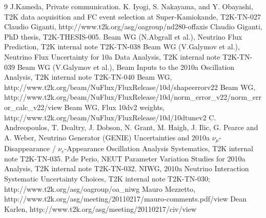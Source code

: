 \documentclass[final]{elsarticle}
\begin{document}
\begin{thebibliography}{9}
  J.Kameda, Private communication.
   K. Iyogi, S. Nakayama, and Y. Obayashi,
   T2K data acquisition and FC event selection at Super-Kamiokande,
   T2K-TN-027
%
%
  Claudio Giganti, http://www.t2k.org/asg/oagroup/nd280-offaxis
  Claudio Giganti, PhD thesis, T2K-THESIS-005.
%
%
  Beam WG (N.Abgrall et al.), Neutrino Flux Prediction, T2K internal note T2K-TN-038
  Beam WG (V.Galymov et al.), Neutrino Flux Uncertainty for 10a Data Analysis, T2K internal note T2K-TN-039
  Beam WG (V.Galymov et al.), Beam Inputs to the 2010a Oscillation Analysis, T2K internal note T2K-TN-040
  Beam WG, http://www.t2k.org/beam/NuFlux/FluxRelease/10d/shapeerrorv22
  Beam WG, http://www.t2k.org/beam/NuFlux/FluxRelease/10d/norm\_error\_v22/norm\_error\_calc\_v22/view
  Beam WG, Flux 10dv2 weights, http://www.t2k.org/beam/NuFlux/FluxRelease/10d/10dtunev2
%
%
  C. Andreopoulos, T. Dealtry, J. Dobson, N. Grant, M. Haigh, J. Ilic, G. Pearce and A. Weber,
  Neutrino Generator (GENIE) Uncertainties and 2010a 
  $\nu_{\mu}$-Disappearance / $\nu_{e}$-Appearance Oscillation Analysis Systematics,
  T2K internal note T2K-TN-035.
  P.de Perio, NEUT Parameter Variation Studies for 2010a Analysis,
  T2K internal note T2K-TN-032.
  NIWG, 2010a Neutrino Interaction Systematic Uncertainty Choices, T2K internal note T2K-TN-030;
  http://www.t2k.org/asg/oagroup/oa\_niwg
%
%
%
  Mauro Mezzetto, http://www.t2k.org/asg/meeting/20110217/mauro-comments.pdf/view
  Dean Karlen, http://www.t2k.org/asg/meeting/20110217/civ/view

\end{thebibliography}
\end{document}
